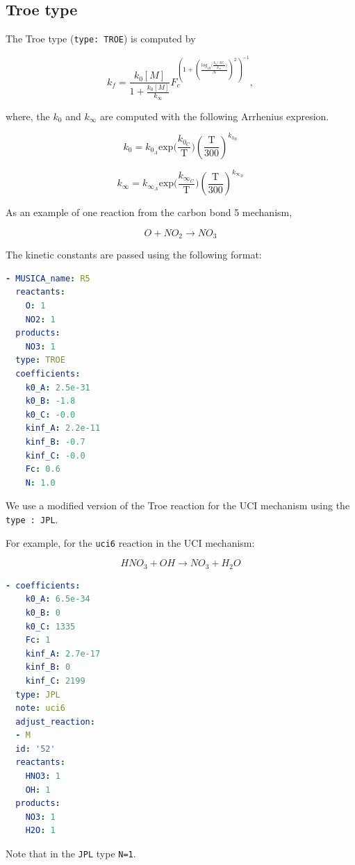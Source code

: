 \documentclass[report, 12pt]{SANDreport}
\begin{document}
\subsection{Troe type}
The Troe type (\verb|type: TROE|) is computed by

\begin{equation}
k_f=\frac{k_0[M]}{1+\frac{k_0[M]}{k_{\infty}}}F_c^{\left(1+\left(\frac{log_{10} \big(\frac{k_0[M]}{k_{\infty}} \big)}{N}\right)^2 \right)^{-1}},
\end{equation}

where, the $k_0$ and $k_{\infty}$ are computed with the following Arrhenius expresion.

\begin{equation}
k_0 = k_{0_A} \mathrm{exp} \Big( \frac{k_{0_C}}{\mathrm{T}} \Big)  \left(\frac{\mathrm{T}}{300}\right)^{k_{0_B}}
\end{equation}

\begin{equation}
k_{\infty} = k_{\infty_A} \mathrm{exp} \Big( \frac{k_{\infty_C}}{\mathrm{T}} \Big) \left(\frac{\mathrm{T}}{300}\right)^{k_{\infty_B}}
\end{equation}

As an example of one reaction from the carbon bond 5 mechanism,

\begin{equation}
O + NO_2 \rightarrow NO_3
\end{equation}

The kinetic constants are passed using the following format:

\begin{lstlisting}[language=yaml]
- MUSICA_name: R5
  reactants:
    O: 1
    NO2: 1
  products:
    NO3: 1
  type: TROE
  coefficients:
    k0_A: 2.5e-31
    k0_B: -1.8
    k0_C: -0.0
    kinf_A: 2.2e-11
    kinf_B: -0.7
    kinf_C: -0.0
    Fc: 0.6
    N: 1.0
\end{lstlisting}

We use a modified version of the Troe reaction for the UCI mechanism using the \verb|type : JPL|.

For example, for the \verb|uci6| reaction in the UCI mechanism:

\begin{equation}
HNO_3 + OH \rightarrow NO_3 + H_2O
\end{equation}

\begin{lstlisting}[language=yaml]
- coefficients:
    k0_A: 6.5e-34
    k0_B: 0
    k0_C: 1335
    Fc: 1
    kinf_A: 2.7e-17
    kinf_B: 0
    kinf_C: 2199
  type: JPL
  note: uci6
  adjust_reaction:
  - M
  id: '52'
  reactants:
    HNO3: 1
    OH: 1
  products:
    NO3: 1
    H2O: 1
\end{lstlisting}
Note that in the \verb|JPL| type \verb|N=1|.
\end{document}
